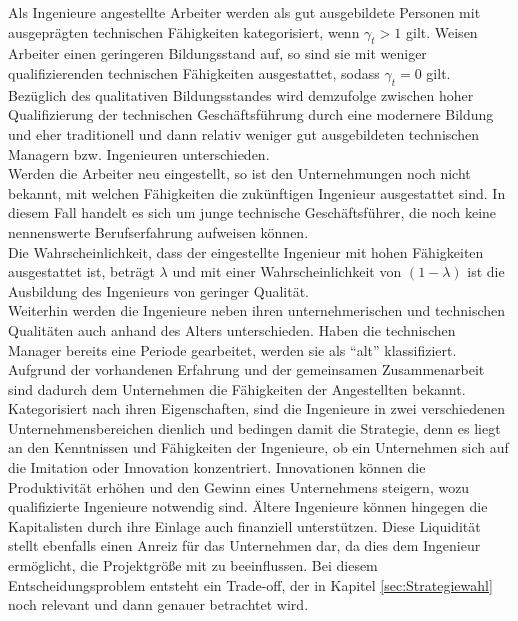 Als Ingenieure angestellte Arbeiter werden als gut ausgebildete Personen mit ausgeprägten technischen Fähigkeiten kategorisiert, wenn $\gamma_t >1$ gilt. Weisen Arbeiter einen geringeren Bildungsstand auf, so sind sie mit weniger qualifizierenden technischen Fähigkeiten ausgestattet, sodass  $\gamma_t=0$ gilt. Bezüglich des qualitativen Bildungsstandes wird demzufolge zwischen hoher Qualifizierung der technischen Geschäftsführung durch eine modernere Bildung und eher traditionell und dann relativ weniger gut ausgebildeten technischen Managern bzw. Ingenieuren unterschieden.\\
Werden die Arbeiter neu eingestellt, so ist den Unternehmungen noch nicht bekannt, mit welchen Fähigkeiten die zukünftigen Ingenieur  ausgestattet sind. In diesem Fall handelt es sich um junge technische Geschäftsführer, die noch keine nennenswerte Berufserfahrung aufweisen können.\\ 
Die Wahrscheinlichkeit, dass der eingestellte Ingenieur mit hohen Fähigkeiten ausgestattet ist, beträgt $\lambda$ und mit einer Wahrscheinlichkeit von $(1-\lambda)$ ist die Ausbildung des Ingenieurs von geringer Qualität.\\
Weiterhin werden die Ingenieure neben ihren unternehmerischen und technischen Qualitäten auch anhand des Alters unterschieden. Haben die technischen Manager bereits eine Periode gearbeitet, werden sie als "`alt"' klassifiziert. Aufgrund der vorhandenen Erfahrung und der gemeinsamen Zusammenarbeit sind dadurch dem Unternehmen die Fähigkeiten der Angestellten bekannt.\\
Kategorisiert nach ihren Eigenschaften, sind die Ingenieure in zwei verschiedenen Unternehmensbereichen dienlich und bedingen damit die Strategie, denn es liegt an den Kenntnissen und Fähigkeiten der Ingenieure, ob ein Unternehmen sich auf die Imitation oder Innovation konzentriert. Innovationen können die Produktivität erhöhen und den Gewinn eines Unternehmens steigern, wozu qualifizierte Ingenieure notwendig sind. Ältere Ingenieure können hingegen die Kapitalisten durch ihre Einlage auch finanziell unterstützen. Diese Liquidität stellt ebenfalls einen Anreiz für das Unternehmen dar, da dies dem Ingenieur ermöglicht, die Projektgrö{\ss}e mit zu beeinflussen. Bei diesem Entscheidungsproblem entsteht ein Trade-off, der in Kapitel \ref{sec:Strategiewahl} noch relevant und dann genauer betrachtet wird.


